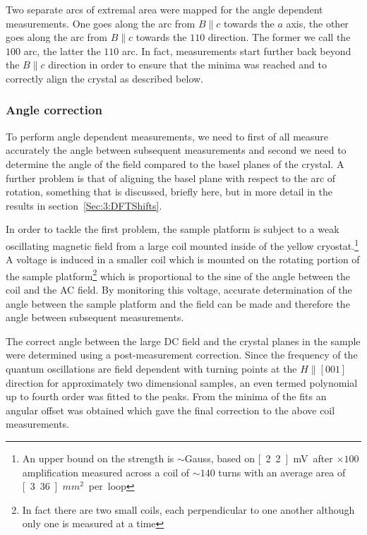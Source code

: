 Two separate arcs of extremal area were mapped for the angle dependent measurements. One goes along the arc from $B\parallel c$ towards the $a$ axis, the other goes along the arc from $B\parallel c$ towards the $110$ direction. The former we call the $100$ arc, the latter the $110$ arc. In fact, measurements start further back beyond the $B\parallel c$ direction in order to ensure that the minima was reached and to correctly align the crystal as described below.

\subsubsection{Angle correction}
    \label{Sec:2:AngleCorrection}

To perform angle dependent measurements, we need to first of all measure accurately the angle between subsequent measurements and second we need to determine the angle of the field compared to the basel planes of the crystal. A further problem is that of aligning the basel plane with respect to the arc of rotation, something that is discussed, briefly here, but in more detail in the results in section~\ref{Sec:3:DFTShifts}.

In order to tackle the first problem, the sample platform is subject to a weak oscillating magnetic field from a large coil mounted inside of the yellow cryostat.\footnote{An upper bound on the strength is $\sim$\unit[500]{Gauss}, based on \unit[2.2]{mV} after $\times100$ amplification measured across a coil of $\sim140$ turns with an average area of \unit[3.36]{$mm^2$} per loop} A voltage is induced in a smaller coil which is mounted on the rotating portion of the sample platform\footnote{In fact there are two small coils, each perpendicular to one another although only one is measured at a time} which is proportional to the sine of the angle between the coil and the AC field. By monitoring this voltage, accurate determination of the angle between the sample platform and the field can be made and therefore the angle between subsequent measurements.

The correct angle between the large DC field and the crystal planes in the sample were determined using a post-measurement correction. Since the frequency of the quantum oscillations are field dependent with turning points at the $H\parallel [001]$ direction for approximately two dimensional samples, an even termed polynomial up to fourth order was fitted to the peaks. From the minima of the fits an angular offset was obtained which gave the final correction to the above coil measurements.


